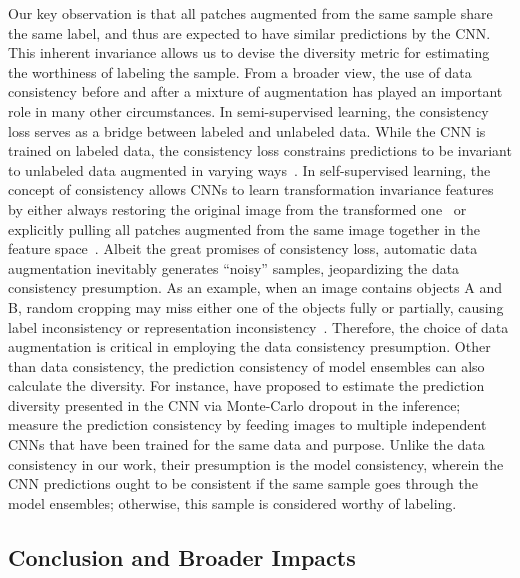 Our key observation is that all patches augmented from the same sample share the same label, and thus are expected to have similar predictions by the CNN. This inherent invariance allows us to devise the diversity metric for estimating the worthiness of labeling the sample. From a broader view, the use of data consistency before and after a mixture of augmentation has played an important role in many other circumstances. In semi-supervised learning, the consistency loss serves as a bridge between labeled and unlabeled data. While the CNN is trained on labeled data, the consistency loss constrains predictions to be invariant to unlabeled data augmented in varying ways~\citep{yu2019uncertainty,cui2019semi,bortsova2019semi,fotedar2020extreme,gao2020consistency}. In self-supervised learning, the concept of consistency allows CNNs to learn transformation invariance features by either always restoring the original image from the transformed one~\citep{zhu2020rubik,zhou2021models} or explicitly pulling all patches augmented from the same image together in the feature space~\citep{feng2020parts2whole,chen2020simple,he2020momentum}. Albeit the great promises of consistency loss, automatic data augmentation inevitably generates ``noisy'' samples, jeopardizing the data consistency presumption. As an example, when an image contains objects A and B, random cropping may miss either one of the objects fully or partially, causing label inconsistency or representation inconsistency~\citep{purushwalkam2020demystifying,hinton2021represent}. Therefore, the choice of data augmentation is critical in employing the data consistency presumption. Other than data consistency, the prediction consistency of model ensembles can also calculate the diversity. For instance, \citet{gal2016dropout,gal2017deep,tsymbalov2018dropout} have proposed to estimate the prediction diversity presented in the CNN via Monte-Carlo dropout in the inference;~\citet{beluch2018power,yang2017suggestive,kuo2018cost,li2020transformation,venturini2020uncertainty} measure the prediction consistency by feeding images to multiple independent CNNs that have been trained for the same data and purpose. Unlike the data consistency in our work, their presumption is the model consistency, wherein the CNN predictions ought to be consistent if the same sample goes through the model ensembles; otherwise, this sample is considered worthy of labeling.


\subsection{Conclusion and Broader Impacts}
\label{ch3:discussion_conclusion:conclusion_broader_impacts}


